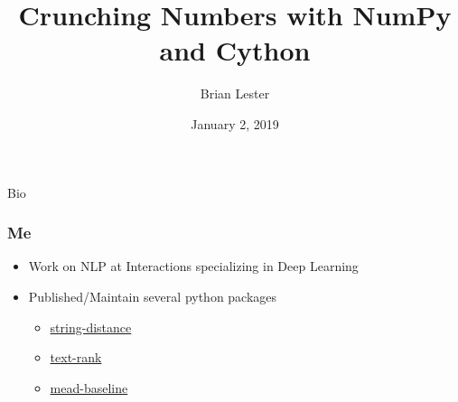 \documentclass{beamer}
\title{Crunching Numbers with NumPy and Cython}
\author{Brian Lester}
\institute{Interactions}
\date{January 2, 2019}
\theoremstyle{case}
\begin{document}
\def\R{\mathbb{R}}
\frame{\titlepage}

\begin{section}{Bio}

\begin{frame}
    \frametitle{Me}
    \begin{itemize}
        \item Work on NLP at Interactions specializing in Deep Learning
        \item Published/Maintain several python packages
        \begin{itemize}
            \item \href{https://github.com/blester125/string-distance}{string-distance}
            \item \href{https://github.com/blester125/text-rank}{text-rank}
            \item \href{https://github.com/dpressel/mead-baseline}{mead-baseline}
        \end{itemize}
    \end{itemize}
\end{frame}

\end{section} %
\end{document}
